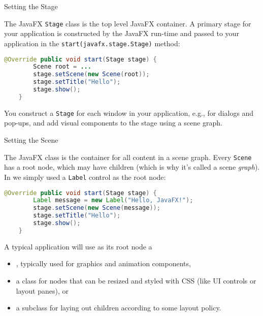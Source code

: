 \documentclass{beamer}
\begin{document}
\begin{frame}[fragile]{Setting the Stage}

The JavaFX {\tt Stage} class is the top level JavaFX container.  A primary stage for your application is constructed by the JavaFX run-time and passed to your application in the {\tt start(javafx.stage.Stage)} method:

\begin{lstlisting}[language=Java]
    @Override public void start(Stage stage) {
        Scene root = ...
        stage.setScene(new Scene(root));
        stage.setTitle("Hello");
        stage.show();
    }
\end{lstlisting}

You construct a {\tt Stage} for each window in your application, e.g., for dialogs and pop-ups, and add visual components to the stage using a scene graph.

\end{frame}

\begin{frame}[fragile]{Setting the Scene}

The JavaFX  class is the container for all content in a scene graph.  Every {\tt Scene} has a root node, which may have children (which is why it's called a scene {\it graph}).  In  we simply used a {\tt Label} control as the root node:

\begin{lstlisting}[language=Java]
    @Override public void start(Stage stage) {
        Label message = new Label("Hello, JavaFX!");
        stage.setScene(new Scene(message));
        stage.setTitle("Hello");
        stage.show();
    }
\end{lstlisting}

A typical application will use as its root node a
\begin{itemize}
  \item {}, typically used for graphics and animation components,
\item a  class for nodes that can be resized and styled with CSS (like UI controls or layout panes), or
\item a  subclass for laying out children according to some layout policy.
\end{itemize}

\end{frame}
\end{document}
